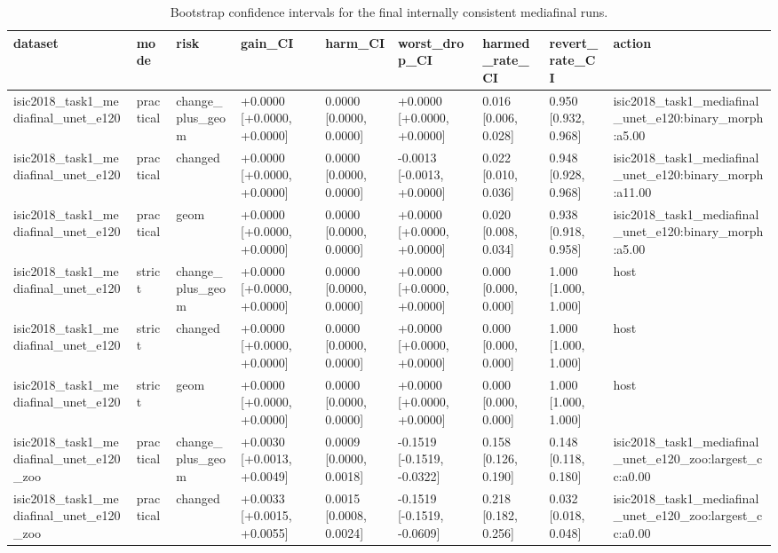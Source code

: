 \begin{table}[t]
\centering
\small
\caption{Bootstrap confidence intervals for the final internally consistent mediafinal runs.}
\label{tab:mediafinal_bootstrap_crc_ablation}
\begin{tabular}{lllllllll}
\toprule
dataset & mode & risk & gain\_CI & harm\_CI & worst\_drop\_CI & harmed\_rate\_CI & revert\_rate\_CI & action \\
\midrule
isic2018\_task1\_mediafinal\_unet\_e120 & practical & change\_plus\_geom & +0.0000 [+0.0000, +0.0000] & 0.0000 [0.0000, 0.0000] & +0.0000 [+0.0000, +0.0000] & 0.016 [0.006, 0.028] & 0.950 [0.932, 0.968] & isic2018\_task1\_mediafinal\_unet\_e120:binary\_morph:a5.00 \\
isic2018\_task1\_mediafinal\_unet\_e120 & practical & changed & +0.0000 [+0.0000, +0.0000] & 0.0000 [0.0000, 0.0000] & -0.0013 [-0.0013, +0.0000] & 0.022 [0.010, 0.036] & 0.948 [0.928, 0.968] & isic2018\_task1\_mediafinal\_unet\_e120:binary\_morph:a11.00 \\
isic2018\_task1\_mediafinal\_unet\_e120 & practical & geom & +0.0000 [+0.0000, +0.0000] & 0.0000 [0.0000, 0.0000] & +0.0000 [+0.0000, +0.0000] & 0.020 [0.008, 0.034] & 0.938 [0.918, 0.958] & isic2018\_task1\_mediafinal\_unet\_e120:binary\_morph:a5.00 \\
isic2018\_task1\_mediafinal\_unet\_e120 & strict & change\_plus\_geom & +0.0000 [+0.0000, +0.0000] & 0.0000 [0.0000, 0.0000] & +0.0000 [+0.0000, +0.0000] & 0.000 [0.000, 0.000] & 1.000 [1.000, 1.000] & host \\
isic2018\_task1\_mediafinal\_unet\_e120 & strict & changed & +0.0000 [+0.0000, +0.0000] & 0.0000 [0.0000, 0.0000] & +0.0000 [+0.0000, +0.0000] & 0.000 [0.000, 0.000] & 1.000 [1.000, 1.000] & host \\
isic2018\_task1\_mediafinal\_unet\_e120 & strict & geom & +0.0000 [+0.0000, +0.0000] & 0.0000 [0.0000, 0.0000] & +0.0000 [+0.0000, +0.0000] & 0.000 [0.000, 0.000] & 1.000 [1.000, 1.000] & host \\
isic2018\_task1\_mediafinal\_unet\_e120\_zoo & practical & change\_plus\_geom & +0.0030 [+0.0013, +0.0049] & 0.0009 [0.0000, 0.0018] & -0.1519 [-0.1519, -0.0322] & 0.158 [0.126, 0.190] & 0.148 [0.118, 0.180] & isic2018\_task1\_mediafinal\_unet\_e120\_zoo:largest\_cc:a0.00 \\
isic2018\_task1\_mediafinal\_unet\_e120\_zoo & practical & changed & +0.0033 [+0.0015, +0.0055] & 0.0015 [0.0008, 0.0024] & -0.1519 [-0.1519, -0.0609] & 0.218 [0.182, 0.256] & 0.032 [0.018, 0.048] & isic2018\_task1\_mediafinal\_unet\_e120\_zoo:largest\_cc:a0.00 \\

\end{tabular}
\end{table}
